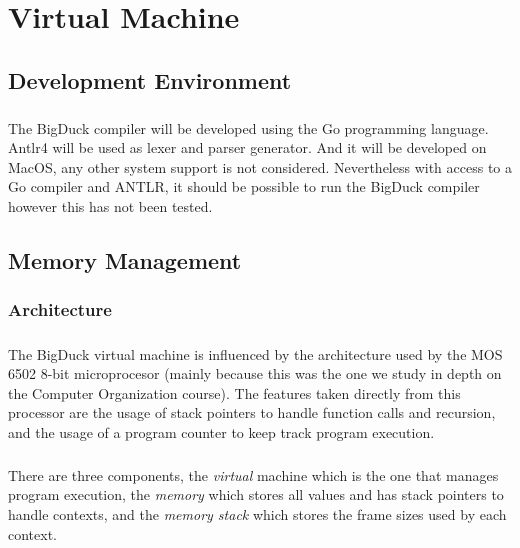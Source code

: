 
\chapter{Virtual Machine}

\section{Development Environment}

\paragraph{} The BigDuck compiler will be developed using the Go programming
language. Antlr4 will be used as lexer and parser generator. And it will be
developed on MacOS, any other system support is not considered. Nevertheless
with access to a Go compiler and ANTLR, it should be possible to run the
BigDuck compiler however this has not been tested.

\section{Memory Management}
\subsection{Architecture}

\paragraph{} The BigDuck virtual machine is influenced by the architecture used
by the MOS 6502 8-bit microprocesor (mainly because this was the one we study
in depth on the Computer Organization course). The features taken directly from
this processor are the usage of stack pointers to handle function calls
and recursion, and the usage of a program counter to keep track program
execution.

\paragraph{} There are three components, the \emph{virtual} machine which is
the one that manages program execution, the \emph{memory} which stores all
values and has stack pointers to handle contexts, and the \emph{memory stack}
which stores the frame sizes used by each context.

\newpage

